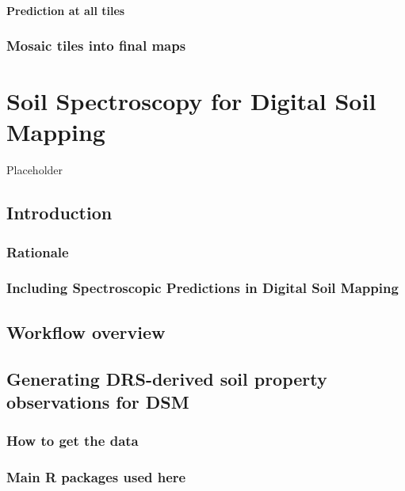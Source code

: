 \documentclass[
  10pt,
  b5paper,
  oneside]{book}
\begin{document}
\subsubsection{Prediction at all tiles}\label{prediction-at-all-tiles}

\subsection{Mosaic tiles into final maps}\label{mosaic-tiles-into-final-maps}

\chapter{Soil Spectroscopy for Digital Soil Mapping}\label{soil-spectroscopy-for-digital-soil-mapping}

Placeholder

\section{Introduction}\label{introduction-1}

\subsection{Rationale}\label{rationale}

\subsection{Including Spectroscopic Predictions in Digital Soil Mapping}\label{including-spectroscopic-predictions-in-digital-soil-mapping}

\section{Workflow overview}\label{workflow-overview}

\section{Generating DRS-derived soil property observations for DSM}\label{generating-drs-derived-soil-property-observations-for-dsm}

\subsection{How to get the data}\label{how-to-get-the-data}

\subsection{Main R packages used here}\label{main-r-packages-used-here}
\end{document}
